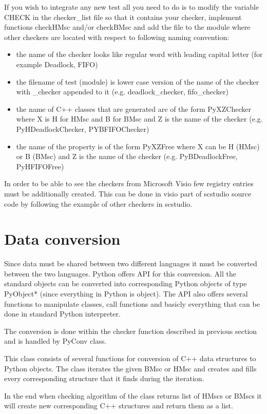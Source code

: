\documentclass[11pt,oneside]{fithesis2}
\begin{document}
If you wish to integrate any new test all you need to do is to modify the variable CHECK in the checker\_list file so that it contains your checker, implement functions checkHMsc and/or checkBMsc and add the file to the module where other checkers are located with respect to following naming convention:
\begin{itemize}
\item{the name of the checker looks like regular word with leading capital letter (for example Deadlock, FIFO)}
\item{the filename of test (module) is lower case version of the name of the checker with \_checker appended to it (e.g. deadlock\_checker, fifo\_checker)}
\item{the name of C++ classes that are generated are of the form PyXZChecker where X is H for HMsc and B for BMsc and Z is the name of the checker (e.g. PyHDeadlockChecker, PYBFIFOChecker)}
\item{the name of the property is of the form PyXZFree where X can be H (HMsc) or B (BMsc) and Z is the name of the checker (e.g. PyBDeadlockFree, PyHFIFOFree)}
\end{itemize}

In order to be able to see the checkers from Microsoft Visio few registry entries must be additionally created. This can be done in visio part of scstudio source code by following the example of other checkers in scstudio.

\section{Data conversion}
Since data must be shared between two different languages it must be converted between the two languages. Python offers API for this conversion. All the standard objects can be converted into corresponding Python objects of type PyObject* (since everything in Python is object). The API also offers several functions to manipulate classes, call functions and basicly everything that can be done in standard Python interpreter.

The conversion is done within the checker function described in previous section and is handled by PyConv class.

This class consists of several functions for conversion of C++ data structures to Python objects. The class iterates the given BMsc or HMsc and creates and fills every corresponding structure that it finds during the iteration.

In the end when checking algorithm of the class returns list of HMscs or BMscs it will create new corresponding C++ structures and return them as a list.
\end{document}
